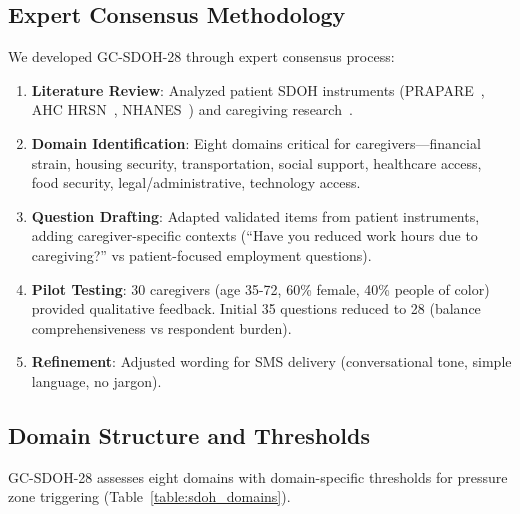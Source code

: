 \documentclass{article}%
\begin{document}
\subsection{Expert Consensus Methodology}%
\label{subsec:ExpertConsensusMethodology}%
We developed GC-SDOH-28 through expert consensus process:
\begin{enumerate}
    \item \textbf{Literature Review}: Analyzed patient SDOH instruments (PRAPARE~\cite{prapare}, AHC HRSN~\cite{ahc}, NHANES~\cite{nhanes}) and caregiving research~\cite{aarp2025, bella2006, tebb1999}.
    \item \textbf{Domain Identification}: Eight domains critical for caregivers—financial strain, housing security, transportation, social support, healthcare access, food security, legal/administrative, technology access.
    \item \textbf{Question Drafting}: Adapted validated items from patient instruments, adding caregiver-specific contexts (``Have you reduced work hours due to caregiving?'' vs patient-focused employment questions).
    \item \textbf{Pilot Testing}: 30 caregivers (age 35-72, 60\% female, 40\% people of color) provided qualitative feedback. Initial 35 questions reduced to 28 (balance comprehensiveness vs respondent burden).
    \item \textbf{Refinement}: Adjusted wording for SMS delivery (conversational tone, simple language, no jargon).
\end{enumerate}

%
\subsection{Domain Structure and Thresholds}%
\label{subsec:DomainStructureandThresholds}%
GC-SDOH-28 assesses eight domains with domain-specific thresholds for pressure zone triggering (Table~\ref{table:sdoh_domains}).
\end{document}
